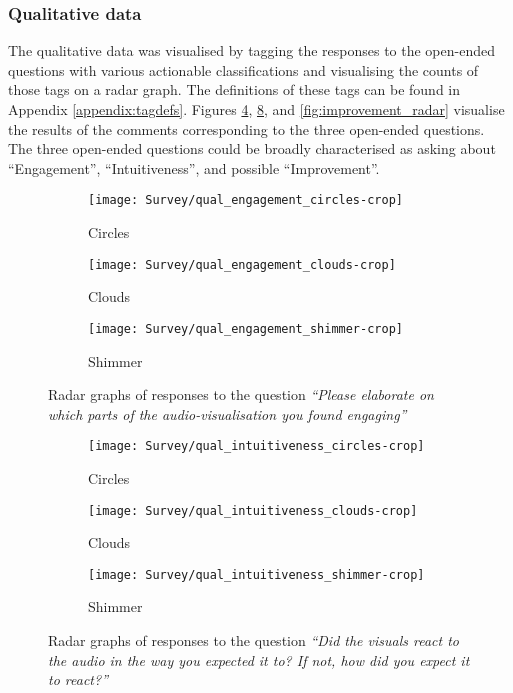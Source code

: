 \documentclass[../initial_thesis.tex]{subfiles}
\begin{document}
\subsubsection{Qualitative data}
The qualitative data was visualised by tagging the responses to the open-ended questions with various actionable classifications and visualising the counts of those tags on a radar graph. The definitions of these tags can be found in Appendix \ref{appendix:tagdefs}. Figures \ref{fig:engagement_radar}, \ref{fig:intuitiveness_radar}, and \ref{fig:improvement_radar} visualise the results of the comments corresponding to the three open-ended questions. The three open-ended questions could be broadly characterised as asking about ``Engagement'', ``Intuitiveness'', and possible ``Improvement''.

\begin{figure}
  \begin{subfigure}{0.32\textwidth}
    \centering
    \texttt{[image: Survey/qual\_engagement\_circles-crop]}
    \caption{Circles}
    \label{fig:engagement_circles}
  \end{subfigure}
  \begin{subfigure}{0.32\textwidth}
    \centering
    \texttt{[image: Survey/qual\_engagement\_clouds-crop]}
    \caption{Clouds}
    \label{fig:engagement_clouds}
  \end{subfigure}
  \begin{subfigure}{0.32\textwidth}
    \centering
    \texttt{[image: Survey/qual\_engagement\_shimmer-crop]}
    \caption{Shimmer}
    \label{fig:engagement_shimmer}
  \end{subfigure}
  \caption{Radar graphs of responses to the question \textit{``Please elaborate on which parts of the audio-visualisation you found engaging''}}
  \label{fig:engagement_radar}
\end{figure}

\begin{figure}
  \begin{subfigure}{0.32\textwidth}
    \centering
    \texttt{[image: Survey/qual\_intuitiveness\_circles-crop]}
    \caption{Circles}
    \label{fig:intuitiveness_circles}
  \end{subfigure}
  \begin{subfigure}{0.32\textwidth}
    \centering
    \texttt{[image: Survey/qual\_intuitiveness\_clouds-crop]}
    \caption{Clouds}
    \label{fig:intuitiveness_clouds}
  \end{subfigure}
  \begin{subfigure}{0.32\textwidth}
    \centering
    \texttt{[image: Survey/qual\_intuitiveness\_shimmer-crop]}
    \caption{Shimmer}
    \label{fig:intuitiveness_shimmer}
  \end{subfigure}
  \caption{Radar graphs of responses to the question \textit{``Did the visuals react to the audio in the way you expected it to? If not, how did you expect it to react?''}}
  \label{fig:intuitiveness_radar}
\end{figure}
\end{document}
